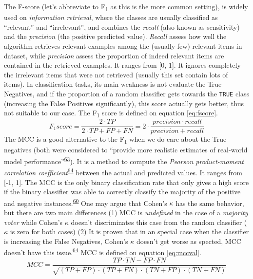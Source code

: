 \documentclass[12pt,twoside]{fmupthesis}
\begin{document}
The F-score (let's abbreviate to F\textsubscript{1} as this is the more common setting), is widely used on
\emph{information retrieval}, where the classes are usually classified as ``relevant'' and ``irrelevant'',
and combines the \emph{recall} (also known as sensitivity) and the \emph{precision} (the positive predicted
value). \emph{Recall} assess how well the algorithm retrieves relevant examples among the (usually few)
relevant items in dataset, while \emph{precision} assess the proportion of indeed relevant items are
contained in the retrieved examples. It ranges from {[}0, 1{]}. It ignores completely the irrelevant
items that were not retrieved (usually this set contain lots of items). In classification tasks, its
main weakness is not evaluate the True Negatives, and if the proportion of a random classifier gets
towards the \texttt{TRUE} class (increasing the False Positives significantly), this score actually gets
better, thus not suitable to our case. The F\textsubscript{1} score is defined on equation \eqref{eq:fscore}.
\begin{equation}
F_1 score = \frac{2 \cdot TP}{2 \cdot TP + FP + FN} = 2 \cdot \frac{precision \cdot recall}{precision + recall} \label{eq:fscore}
\end{equation}
The MCC is a good alternative to the F\textsubscript{1} when we do care about the True negatives (both were
considered to ``provide more realistic estimates of real-world model performance''\textsuperscript{\protect\hyperlink{ref-Dubey2018}{63}}). It
is a method to compute the \emph{Pearson product-moment correlation coefficient}\textsuperscript{\protect\hyperlink{ref-Delgado2019}{64}} between
the actual and predicted values. It ranges from {[}-1, 1{]}. The MCC is the only binary classification
rate that only gives a high score if the binary classifier was able to correctly classify the
majority of the positive and negative instances.\textsuperscript{\protect\hyperlink{ref-Chicco2020}{60}} One may argue that Cohen's \(\kappa\)
has the same behavior, but there are two main differences (1) MCC is \emph{undefined} in the case of a
\emph{majority voter} while Cohen's \(\kappa\) doesn't discriminates this case from the random classifier
(\(\kappa\) is zero for both cases) (2) It is proven that in an special case when the classifier is
increasing the False Negatives, Cohen's \(\kappa\) doesn't get worse as spected, MCC
doesn't have this issue.\textsuperscript{\protect\hyperlink{ref-Delgado2019}{64}} MCC is defined on equation \eqref{eq:mccval}.
\begin{equation}
MCC = \frac{TP \cdot TN - FP \cdot FN}{\sqrt{(TP + FP) \cdot (TP + FN) \cdot (TN + FP) \cdot (TN + FN)}} \label{eq:mccval}
\end{equation}
\end{document}
